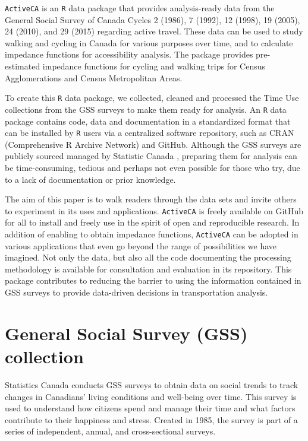 \documentclass[Royal,times,sageh]{sagej}
\begin{document}
\texttt{ActiveCA} is an \texttt{R} data package that provides
analysis-ready data from the General Social Survey of Canada Cycles 2
(1986), 7 (1992), 12 (1998), 19 (2005), 24 (2010), and 29 (2015)
\citep{statisticscanada2024} regarding active travel. These data can be
used to study walking and cycling in Canada for various purposes over
time, and to calculate impedance functions for accessibility analysis.
The package provides pre-estimated impedance functions for cycling and
walking trips for Census Agglomerations and Census Metropolitan Areas.

To create this \texttt{R} data package, we collected, cleaned and
processed the Time Use collections from the GSS surveys to make them
ready for analysis. An \texttt{R} data package contains code, data and
documentation in a standardized format that can be installed by
\texttt{R} users via a centralized software repository, such as CRAN
(Comprehensive R Archive Network) and GitHub. Although the GSS surveys
are publicly sourced managed by Statistic Canada
\citep{statisticscanada2024}, preparing them for analysis can be
time-consuming, tedious and perhaps not even possible for those who try,
due to a lack of documentation or prior knowledge.

The aim of this paper is to walk readers through the data sets and
invite others to experiment in its uses and applications.
\texttt{ActiveCA} is freely available on GitHub for all to install and
freely use in the spirit of open and reproducible research. In addition
of enabling to obtain impedance functions, \texttt{ActiveCA} can be
adopted in various applications that even go beyond the range of
possibilities we have imagined. Not only the data, but also all the code
documenting the processing methodology is available for consultation and
evaluation in its repository. This package contributes to reducing the
barrier to using the information contained in GSS surveys to provide
data-driven decisions in transportation analysis.

\hypertarget{general-social-survey-gss-collection}{%
\section{General Social Survey (GSS)
collection}\label{general-social-survey-gss-collection}}

Statistics Canada \citeyearpar{statisticscanada2024} conducts GSS
surveys to obtain data on social trends to track changes in Canadians'
living conditions and well-being over time. This survey is used to
understand how citizens spend and manage their time and what factors
contribute to their happiness and stress. Created in 1985, the survey is
part of a series of independent, annual, and cross-sectional surveys.
\end{document}
